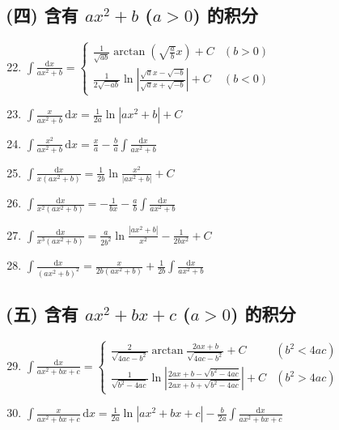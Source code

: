 \subsection*{(四) 含有 $ax^2 + b$ ($a > 0$) 的积分}

\begin{enumerate}
    \setcounter{enumi}{21}
    \item $\displaystyle \int \frac{\mathrm{d}x}{ax^2 + b} = 
    \begin{cases}
        \displaystyle \frac{1}{\sqrt{ab}} \arctan \left( \sqrt{\frac{a}{b}} x \right) + C & (b > 0) \\
        \displaystyle \frac{1}{2\sqrt{-ab}} \ln \left| \frac{\sqrt{a}x - \sqrt{-b}}{\sqrt{a}x + \sqrt{-b}} \right| + C & (b < 0)
    \end{cases}$
    \item $\displaystyle \int \frac{x}{ax^2 + b} \, \mathrm{d}x = \frac{1}{2a} \ln |ax^2 + b| + C$
    \item $\displaystyle \int \frac{x^2}{ax^2 + b} \, \mathrm{d}x = \frac{x}{a} - \frac{b}{a} \int \frac{\mathrm{d}x}{ax^2 + b}$
    \item $\displaystyle \int \frac{\mathrm{d}x}{x(ax^2 + b)} = \frac{1}{2b} \ln \frac{x^2}{|ax^2 + b|} + C$
    \item $\displaystyle \int \frac{\mathrm{d}x}{x^2(ax^2 + b)} = -\frac{1}{bx} - \frac{a}{b} \int \frac{\mathrm{d}x}{ax^2 + b}$
    \item $\displaystyle \int \frac{\mathrm{d}x}{x^3(ax^2 + b)} = \frac{a}{2b^2} \ln \frac{|ax^2 + b|}{x^2} - \frac{1}{2b x^2} + C$
    \item $\displaystyle \int \frac{\mathrm{d}x}{(ax^2 + b)^2} = \frac{x}{2b(ax^2 + b)} + \frac{1}{2b} \int \frac{\mathrm{d}x}{ax^2 + b}$
\end{enumerate}

\subsection*{(五) 含有 $ax^2 + bx + c$ ($a > 0$) 的积分}

\begin{enumerate}
    \setcounter{enumi}{28}
    \item $\displaystyle \int \frac{\mathrm{d}x}{ax^2 + bx + c} = 
    \begin{cases}
        \displaystyle \frac{2}{\sqrt{4ac - b^2}} \arctan \frac{2ax + b}{\sqrt{4ac - b^2}} + C & (b^2 < 4ac) \\
        \displaystyle \frac{1}{\sqrt{b^2 - 4ac}} \ln \left| \frac{2ax + b - \sqrt{b^2 - 4ac}}{2ax + b + \sqrt{b^2 - 4ac}} \right| + C & (b^2 > 4ac)
    \end{cases}$
    \item $\displaystyle \int \frac{x}{ax^2 + bx + c} \, \mathrm{d}x = \frac{1}{2a} \ln |ax^2 + bx + c| - \frac{b}{2a} \int \frac{\mathrm{d}x}{ax^2 + bx + c}$
\end{enumerate}

